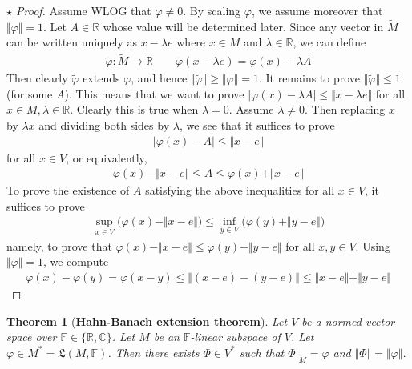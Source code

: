 \documentclass[12pt,b5paper,notitlepage]{article}
\theoremstyle{definition}
\theoremstyle{plain}
\newtheorem{thm}[df]{Theorem}
\newcommand{\fk}{\mathfrak}
\newcommand{\wtd}{\widetilde}
\newcommand{\Cbb}{\mathbb C}
\newcommand{\Rbb}{\mathbb R}
\newcommand{\Fbb}{\mathbb F}
\numberwithin{equation}{section}
\begin{document}
\begin{proof}[$\star$ Proof]
Assume WLOG that $\varphi\neq0$. By scaling $\varphi$, we assume moreover that $\Vert\varphi\Vert=1$. Let $A\in\Rbb$ whose value will be determined later. Since any vector in $\wtd M$ can be written uniquely as  $x-\lambda e$ where $x\in M$ and $\lambda\in\Rbb$, we can define
\begin{align*}
\wtd\varphi:\wtd M\rightarrow\Rbb\qquad \wtd\varphi(x-\lambda e)=\varphi(x)-\lambda A
\end{align*}
Then clearly $\wtd\varphi$ extends $\varphi$, and hence $\Vert\wtd\varphi\Vert\geq\Vert\varphi\Vert=1$. It remains to prove $\Vert\wtd\varphi\Vert\leq 1$ (for some $A$). This means that we want to prove $|\varphi(x)-\lambda A|\leq \Vert x-\lambda e\Vert$ for all $x\in M,\lambda\in\Rbb$. Clearly this is true when $\lambda=0$. Assume $\lambda\neq 0$. Then replacing $x$ by $\lambda x$ and dividing both sides by $\lambda$, we see that it suffices to prove
\begin{align*}
|\varphi(x)-A|\leq \Vert x-e\Vert
\end{align*}
for all $x\in V$, or equivalently, 
\begin{align*}
\varphi(x)-\Vert x-e\Vert\leq A\leq \varphi(x)+\Vert x-e\Vert
\end{align*}
To prove the existence of $A$ satisfying the above inequalities for all $x\in V$, it suffices to prove
\begin{align*}
\sup_{x\in V}\big(\varphi(x)-\Vert x-e\Vert\big)\leq \inf_{y\in V}\big(\varphi(y)+\Vert y-e\Vert\big)
\end{align*}
namely, to prove that $\varphi(x)-\Vert x-e\Vert\leq \varphi(y)+\Vert y-e\Vert$ for all $x,y\in V$. Using $\Vert\varphi\Vert=1$, we compute
\begin{align*}
\varphi(x)-\varphi(y)=\varphi(x-y)\leq \Vert(x-e)-(y-e)\Vert\leq \Vert x-e\Vert+\Vert y-e\Vert
\end{align*}
\end{proof}


\begin{thm}[\textbf{Hahn-Banach extension theorem}] \label{lb499} 
Let $V$ be a normed vector space over $\Fbb\in\{\Rbb,\Cbb\}$. Let $M$ be an $\Fbb$-linear subspace of $V$. Let $\varphi\in M^*=\fk L(M,\Fbb)$. Then there exists $\Phi\in V^*$ such that $\Phi|_M=\varphi$ and $\Vert\Phi\Vert=\Vert\varphi\Vert$.
\end{thm}
\end{document}
